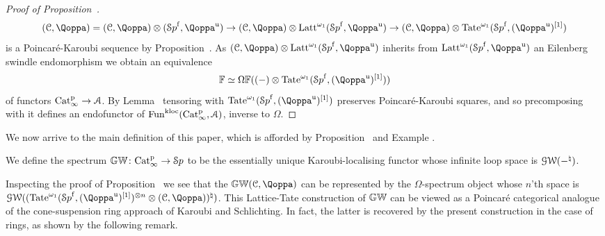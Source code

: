 \begin{proof}[Proof of Proposition~]
\[
(\C,\QF) = (\C,\QF) \otimes (\Spaf,\QF^{\uni}) \to (\C,\QF) \otimes \Latt^{\omega_1}(\Spaf, \QF^{\uni}) \to (\C,\QF) \otimes \Tate^{\omega_1}(\Spaf, (\QF^{\uni})\qshift{1})
\]
is a Poincaré-Karoubi sequence by Proposition~\;.
As $(\C,\QF) \otimes \Latt^{\omega_1}(\Spaf, \QF^{\uni})$ inherits from $\Latt^{\omega_1}(\Spaf, \QF^{\uni})$ an Eilenberg swindle endomorphism
we obtain an equivalence
\[
\FF\simeq \Omega\FF((-) \otimes \Tate^{\omega_1}(\Spaf,(\QF^{\uni})\qshift{1}))
\]
of functors $\mathrm{Cat}^{\mathrm p}_\infty\rightarrow \mathcal{A}$. %
By Lemma~ tensoring with $\Tate^{\omega_1}(\Spaf,(\QF^{\uni})\qshift{1})$ preserves Poincar\'e-Karoubi squares, 
and so precomposing with it defines an endofunctor of $\operatorname{Fun}^{\mathrm{kloc}}(\mathrm{Cat}^{\mathrm p}_\infty,\mathcal{A})$, inverse to $\Omega$.


\end{proof}

















We now arrive to the main definition of this paper, which is afforded by Proposition~ and Example .


\begin{definition}
\label{definition:KGW}%
We define the  spectrum $\mathbb{GW}\colon \mathrm{Cat}^{\mathrm p}_\infty \to {\mathcal Sp}$ to be the essentially unique Karoubi-localising functor whose infinite loop space is $\operatorname{\mathcal{GW}}(-^\natural)$. 
\end{definition}



Inspecting the proof of Proposition~ we see that the $\KGW(\C,\QF)$ can be represented by the $\Omega$-spectrum object whose $n$'th space is $\GWspace((\Tate^{\omega_1}(\Spaf,(\QF^{\uni})\qshift{1})^{\otimes n}\otimes (\C,\QF))^\natural)$. This Lattice-Tate construction of $\mathbb{GW}$ can be viewed as a Poincaré categorical analogue of the cone-suspension ring approach of Karoubi and Schlichting. In fact, the latter is recovered by the present construction in the case of rings, as shown by the following remark. 



